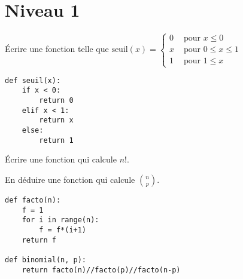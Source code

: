 \section{Niveau 1}
\begin{Exercise}Écrire une fonction  telle que
$\displaystyle\text{seuil}(x) = \left\{\begin{matrix} 0&\text{ pour }x \le 0\\
x&\text{ pour }0\le x \le 1\\
1&\text{ pour }1\le x 
\end{matrix}
\right.$
\begin{center}
\end{center}
\end{Exercise}
\begin{Answer}
\begin{lstlisting}
def seuil(x):
    if x < 0:
        return 0
    elif x < 1:
        return x
    else:
        return 1
\end{lstlisting}
\end{Answer}
\begin{Exercise}Écrire une fonction  qui calcule $n!$.

En déduire une fonction  qui calcule $\binom n p$.
\end{Exercise}
\begin{Answer}
\begin{lstlisting}
def facto(n):
    f = 1
    for i in range(n):
        f = f*(i+1)
    return f
    
def binomial(n, p):
    return facto(n)//facto(p)//facto(n-p)
\end{lstlisting}
\end{Answer}
